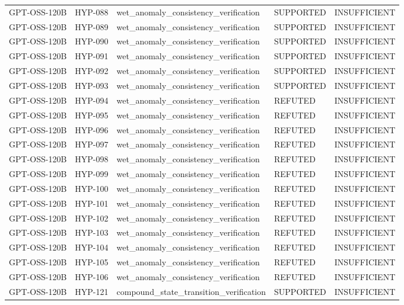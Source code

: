 \begin{tabular}{lllll}
GPT-OSS-120B & HYP-088 & wet_anomaly_consistency_verification & SUPPORTED & INSUFFICIENT \\
GPT-OSS-120B & HYP-089 & wet_anomaly_consistency_verification & SUPPORTED & INSUFFICIENT \\
GPT-OSS-120B & HYP-090 & wet_anomaly_consistency_verification & SUPPORTED & INSUFFICIENT \\
GPT-OSS-120B & HYP-091 & wet_anomaly_consistency_verification & SUPPORTED & INSUFFICIENT \\
GPT-OSS-120B & HYP-092 & wet_anomaly_consistency_verification & SUPPORTED & INSUFFICIENT \\
GPT-OSS-120B & HYP-093 & wet_anomaly_consistency_verification & SUPPORTED & INSUFFICIENT \\
GPT-OSS-120B & HYP-094 & wet_anomaly_consistency_verification & REFUTED & INSUFFICIENT \\
GPT-OSS-120B & HYP-095 & wet_anomaly_consistency_verification & REFUTED & INSUFFICIENT \\
GPT-OSS-120B & HYP-096 & wet_anomaly_consistency_verification & REFUTED & INSUFFICIENT \\
GPT-OSS-120B & HYP-097 & wet_anomaly_consistency_verification & REFUTED & INSUFFICIENT \\
GPT-OSS-120B & HYP-098 & wet_anomaly_consistency_verification & REFUTED & INSUFFICIENT \\
GPT-OSS-120B & HYP-099 & wet_anomaly_consistency_verification & REFUTED & INSUFFICIENT \\
GPT-OSS-120B & HYP-100 & wet_anomaly_consistency_verification & REFUTED & INSUFFICIENT \\
GPT-OSS-120B & HYP-101 & wet_anomaly_consistency_verification & REFUTED & INSUFFICIENT \\
GPT-OSS-120B & HYP-102 & wet_anomaly_consistency_verification & REFUTED & INSUFFICIENT \\
GPT-OSS-120B & HYP-103 & wet_anomaly_consistency_verification & REFUTED & INSUFFICIENT \\
GPT-OSS-120B & HYP-104 & wet_anomaly_consistency_verification & REFUTED & INSUFFICIENT \\
GPT-OSS-120B & HYP-105 & wet_anomaly_consistency_verification & REFUTED & INSUFFICIENT \\
GPT-OSS-120B & HYP-106 & wet_anomaly_consistency_verification & REFUTED & INSUFFICIENT \\
GPT-OSS-120B & HYP-121 & compound_state_transition_verification & SUPPORTED & INSUFFICIENT \\

\end{tabular}
